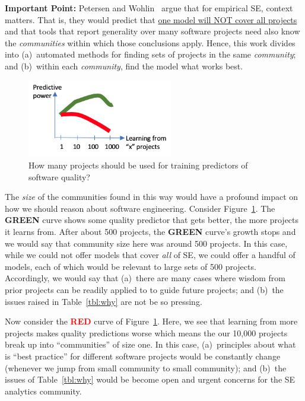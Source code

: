 {\bf Important Point:}  
Petersen and Wohlin~\cite{Petersen2009} argue that for empirical SE, context matters.
That is, they would 
predict that \underline{one model  will NOT  cover
all  projects} and that  
tools that report  generality  over many software projects need also know the {\em communities} within which those conclusions   apply. 
Hence, this work divides into 
 (a)~automated methods for finding sets of  
projects in the same {\em community};
and (b)~within each {\em community}, 
find the model what works best.   


\begin{figure}
\includegraphics[width=2.5in]{figs/results.png}
\caption{How many projects should be used for training predictors of software quality?}\label{results}
\end{figure}
The {\em size} of the communities found in this way
would have a profound impact on how we should reason about software engineering. Consider Figure~\ref{results}. 
The \textcolor{ao(english)}{{\bf GREEN}} curve shows
some quality predictor that gets better, the more projects it learns from. After about 500 projects, the \textcolor{ao(english)}{{\bf GREEN}} curve's growth stops and we would say that community size here was around 500 projects. In this case, while we could not offer models that cover {\em all} of SE, we could offer a handful of models, each of which would be relevant to large sets of 500   projects.
Accordingly, we would say that (a)~there are   many cases where  wisdom from
prior projects can be readily applied to  
to guide future projects; and (b)~the issues raised in Table~\ref{tbl:why} are not be so pressing.


Now consider the \textcolor{red}{{\bf RED}} curve of 
Figure~\ref{results}. Here, we see that learning from more projects makes quality predictions worse which means the our 10,000 projects break up into ``communities'' of size one.
In this case,  (a)~principles about what is ``best practice'' for different software projects
would be constantly change (whenever we jump from small community to small community);
and (b)~the issues of Table~\ref{tbl:why} would be become open and urgent concerns for the SE analytics community.
 


